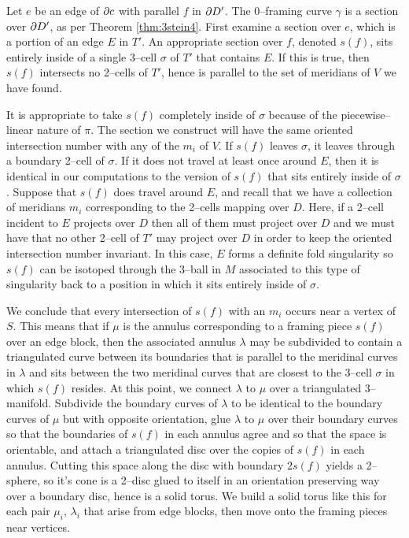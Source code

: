 Let $e$ be an edge of $\partial c$ with parallel $f$ in $\partial D'$.
The 0--framing curve $\gamma$ is a section over $\partial D'$, as per Theorem \ref{thm:3stein4}.
First examine a section over $e$, which is a portion of an edge $E$ in $T'$.
An appropriate section over $f$, denoted $s(f)$, sits entirely inside of a single 3--cell $\sigma$ of $T'$ that contains $E$.
If this is true, then $s(f)$ intersects no 2--cells of $T'$, hence is parallel to the set of meridians of $V$ we have found.

It is appropriate to take $s(f)$ completely inside of $\sigma$ because of the piecewise--linear nature of $\pi$.
The section we construct will have the same oriented intersection number with any of the $m_i$ of $V$.
If $s(f)$ leaves $\sigma$, it leaves through a boundary 2--cell of $\sigma$.
If it does not travel at least once around $E$, then it is identical in our computations to the version of $s(f)$ that sits entirely inside of $\sigma$.
Suppose that $s(f)$ does travel around $E$, and recall that we have a collection of meridians $m_i$ corresponding to the 2--cells mapping over $D$.
Here, if a 2--cell incident to $E$ projects over $D$ then all of them must project over $D$ and we must have that no other 2--cell of $T'$ may project over $D$ in order to keep the oriented intersection number invariant.
In this case, $E$ forms a definite fold singularity so $s(f)$ can be isotoped through the 3--ball in $M$ associated to this type of singularity back to a position in which it sits entirely inside of $\sigma$.

We conclude that every intersection of $s(f)$ with an $m_i$ occurs near a vertex of $S$.
This means that if $\mu$ is the annulus corresponding to a framing piece $s(f)$ over an edge block, then the associated annulus $\lambda$ may be subdivided to contain a triangulated curve between its boundaries that is parallel to the meridinal curves in $\lambda$ and sits between the two meridinal curves that are closest to the 3--cell $\sigma$ in which $s(f)$ resides.
At this point, we connect $\lambda$ to $\mu$ over a triangulated 3--manifold.
Subdivide the boundary curves of $\lambda$ to be identical to the boundary curves of $\mu$ but with opposite orientation, glue $\lambda$ to $\mu$ over their boundary curves so that the boundaries of $s(f)$ in each annulus agree and so that the space is orientable, and attach a triangulated disc over the copies of $s(f)$ in each annulus.
Cutting this space along the disc with boundary $2s(f)$ yields a 2--sphere, so it's cone is a 2--disc glued to itself in an orientation preserving way over a boundary disc, hence is a solid torus.
We build a solid torus like this for each pair $\mu_i$, $\lambda_i$ that arise from edge blocks, then move onto the framing pieces near vertices.

